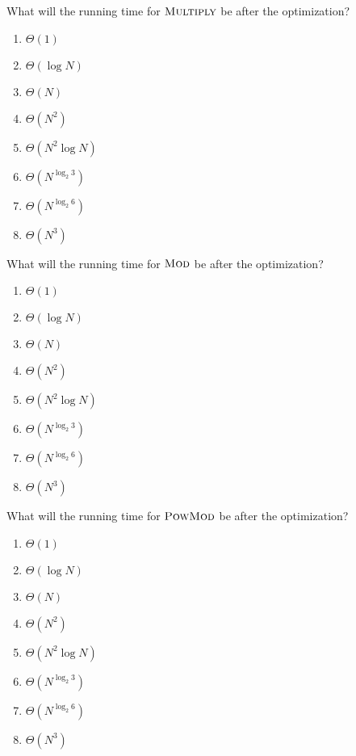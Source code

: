 \documentclass[12pt,twoside]{article}
\begin{document}
\begin{problems}
\begin{problemparts}
\problempart {} What will the running time for $\textnormal{\scshape Multiply}$ be
after the optimization?
\begin{enumerate}
  \item $\Theta(1)$
  \item $\Theta(\log N)$
  \item $\Theta(N)$
  \item $\Theta(N^2)$
  \item $\Theta(N^2 \log N)$
  \item $\Theta(N^{\log_2 3})$
  \item $\Theta(N^{\log_2 6})$
  \item $\Theta(N^3)$
\end{enumerate}

\problempart {} What will the running time for $\textnormal{\scshape Mod}$ be after
the optimization?
\begin{enumerate}
  \item $\Theta(1)$
  \item $\Theta(\log N)$
  \item $\Theta(N)$
  \item $\Theta(N^2)$
  \item $\Theta(N^2 \log N)$
  \item $\Theta(N^{\log_2 3})$
  \item $\Theta(N^{\log_2 6})$
  \item $\Theta(N^3)$
\end{enumerate}

\problempart {} What will the running time for $\textnormal{\scshape PowMod}$ be after
the optimization?
\begin{enumerate}
  \item $\Theta(1)$
  \item $\Theta(\log N)$
  \item $\Theta(N)$
  \item $\Theta(N^2)$
  \item $\Theta(N^2 \log N)$
  \item $\Theta(N^{\log_2 3})$
  \item $\Theta(N^{\log_2 6})$
  \item $\Theta(N^3)$
\end{enumerate}


\end{problemparts}
\end{problems}
\end{document}
